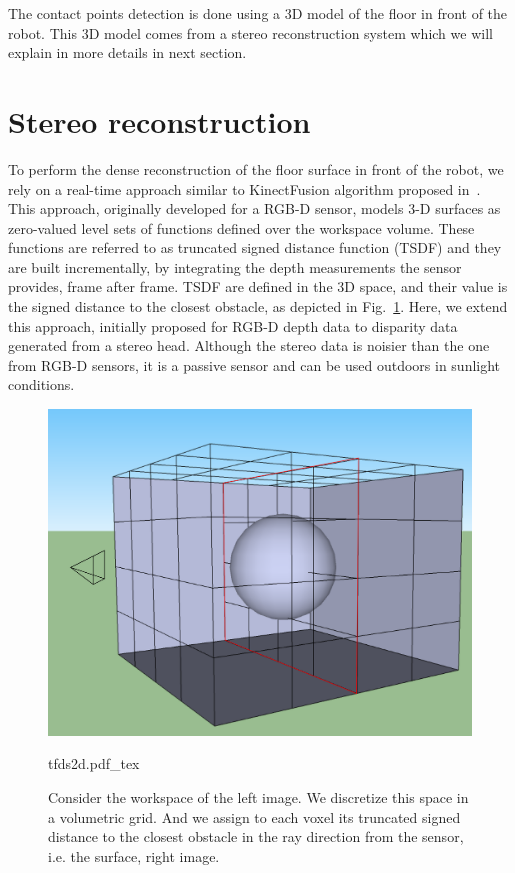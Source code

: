 The contact points detection is done using a 3D model of the floor in front of the robot. This 3D model comes from a stereo reconstruction system which we will explain in more details in next section.

\section{Stereo reconstruction}

To perform the dense reconstruction of the floor surface in front of the robot, we rely on a real-time approach similar to KinectFusion algorithm proposed in~\citep{Newcombe2011}. This approach, originally developed for a RGB-D sensor, models 3-D surfaces as zero-valued level sets of functions defined over the workspace volume. These functions are referred to as truncated signed distance function (TSDF) and they are built incrementally, by integrating the depth measurements the sensor provides, frame after frame. TSDF are defined in the 3D space, and their value is the signed distance to the closest obstacle, as depicted in Fig.~\ref{Fig:TFDS}. Here, we extend this approach, initially proposed for RGB-D depth data to disparity data generated from a stereo head. Although the stereo data is noisier than the one from RGB-D sensors, it is a passive sensor and can be used outdoors in sunlight conditions.


\begin{figure}
  \centering
\includegraphics[scale=0.3]{Chap6-3D-Reconstruction/tfds}
      {\def\svgwidth{0.35\columnwidth}
        
                   {tfds2d.pdf_tex}}
      \caption[]{Consider the workspace of the left image. We discretize this space in a volumetric grid. And we assign to each voxel its truncated signed distance to the closest obstacle in the ray direction from the sensor, i.e. the surface, right image.}
      \label{Fig:TFDS}
\end{figure}


